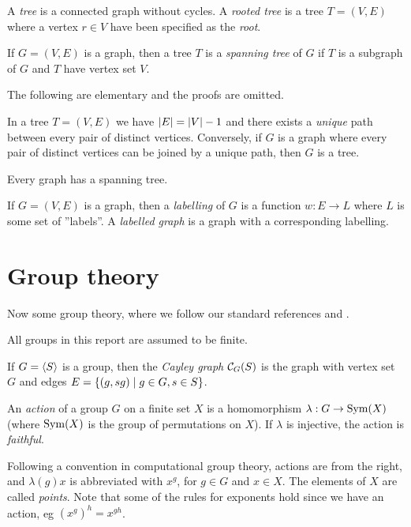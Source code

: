 \begin{deff} \label{def_tree}
A \emph{tree} is a connected graph without cycles. A \emph{rooted tree} is a tree $T = (V, E)$ where a vertex $r \in V$ have been specified as the \emph{root}.
\end{deff}

\begin{deff}
If $G = (V, E)$ is a graph, then a tree $T$ is a \emph{spanning tree} of $G$ if $T$ is a subgraph of $G$ and $T$ have vertex set $V$.
\end{deff}

The following are elementary and the proofs are omitted.
\begin{pr}
In a tree $T = (V, E)$ we have $\left\lvert E \right\rvert = \left\lvert V \right\rvert - 1$ and there
exists a \emph{unique} path between every pair of distinct
vertices. Conversely, if $G$ is a graph where every pair of distinct
vertices can be joined by a unique path, then $G$ is a tree.
\end{pr}

\begin{pr}
Every graph has a spanning tree.
\end{pr}

\begin{deff}
If $G = (V, E)$ is a graph, then a \emph{labelling} of $G$ is a function $w : E \to L$ where $L$ is some set of ''labels''. A \emph{labelled graph} is a graph with a corresponding labelling.
\end{deff}

\section{Group theory}
Now some group theory, where we follow our standard references \cite{bb96} and \cite{rose78}.
\begin{note}
All groups in this report are assumed to be finite.
\end{note}

\begin{deff} \label{def_cayley}
If $G = \left\langle S \right\rangle$ is a group, then the \emph{Cayley graph} $\mathcal{C}_G(S)$ is the graph with vertex set $G$ and edges $E = \left\lbrace  (g, sg) \mid g \in G, s \in S \right\rbrace$.
\end{deff}

\begin{deff}
An \emph{action} of a group $G$ on a finite set $X$ is a homomorphism
$\lambda : G \to \operatorname{Sym}( X )$ (where $\operatorname{Sym}( X )$ is the group of
permutations on $X$). If $\lambda$ is injective, the action is
\emph{faithful}. 
\end{deff}
\begin{remark}
Following a convention in computational group theory, actions are from the right, and $\lambda(g)x$ is abbreviated with $x^g$, for $g \in G$ and $x \in X$. The elements of $X$ are called \emph{points}. Note that some of the rules for exponents hold since we have an action, eg $(x^g)^h = x^{gh}$.
\end{remark}

